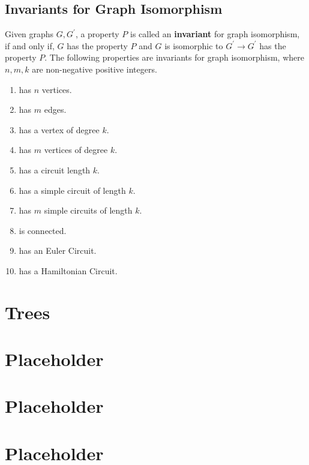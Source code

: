 \documentclass[a4paper]{article}
\begin{document}
  \subsection{Invariants for Graph Isomorphism}
  Given graphs $G,G^\prime$, a property $P$ is called an \textbf{invariant} for graph isomorphism, if and only if, $G$ has the property $P$ and $G$ is isomorphic to $G^\prime \rightarrow G^\prime$ has the property $P$. The following properties are invariants for graph isomorphism, where $n,m,k$ are non-negative positive integers.
  \begin{multicols}{2}
   \begin{enumerate}
    \item has $n$ vertices.
    \item has $m$ edges.
    \item has a vertex of degree $k$.
    \item has $m$ vertices of degree $k$.
    \item has a circuit length $k$.
    \item has a simple circuit of length $k$.
    \item has $m$ simple circuits of length $k$.
    \item is connected.
    \item has an Euler Circuit.
    \item has a Hamiltonian Circuit.
   \end{enumerate} 
  \end{multicols}
  \section{Trees} 
  \section{Placeholder} 
  \section{Placeholder} 
  \section{Placeholder} 
\end{document}
